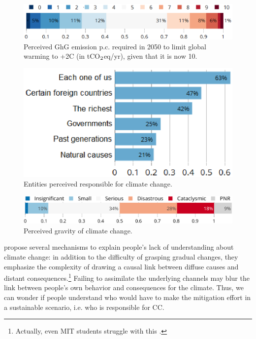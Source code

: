 \documentclass[english,5p,authoryear]{elsarticle}
\begin{document}
\begin{figure}[t]
\centering
\includegraphics[width=\columnwidth]{Images_EPS/CC_target_emission_nolegend.eps}
\caption{Perceived GhG emission p.c. required in 2050 to limit global warming to +2\textdegree{}C (in tCO$_\textnormal{2}$eq/yr), given that it is now 10.}
\label{fig:target_emission}
\end{figure}

%


\begin{figure}[!htbp]
\centering
\includegraphics[width=0.75\columnwidth]{Images_EPS/CC_responsiblec.eps}
\caption{Entities perceived responsible for climate change.}
\label{fig:responsible}
\end{figure}

\begin{figure}[t]
\centering
\includegraphics[width=\columnwidth]{Images_EPS/CC_effects_nolegend.eps}
\caption{Perceived gravity of climate change.}
\label{fig:gravity}
\end{figure}

\citet{millner_beliefs_2016} propose several mechanisms to explain people's lack of understanding about climate change: in addition to the difficulty of grasping gradual changes, they emphasize the complexity of drawing a causal link between diffuse causes and distant consequences.\footnote{Actually, even MIT students struggle with this \citep{sterman_risk_2008}.} Failing to assimilate the underlying channels may blur the link between people's own behavior and consequences for the climate. Thus, we can wonder if people understand who would have to make the mitigation effort in a sustainable scenario, i.e. who is responsible for CC.
\end{document}
